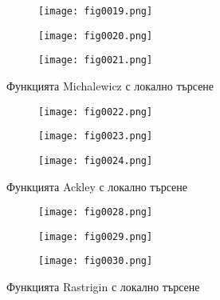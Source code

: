 %
%
\begin{figure}[H]
  \begin{subfigure}{0.31\textwidth}
  \texttt{[image: fig0019.png]}
  \label{fig0019}
  \end{subfigure}
  \begin{subfigure}{0.31\textwidth}
  \texttt{[image: fig0020.png]}
  \label{fig0020}
  \end{subfigure}
  \begin{subfigure}{0.31\textwidth}
  \texttt{[image: fig0021.png]}
  \label{fig0021}
  \end{subfigure}
  \caption{Функцията Michalewicz с локално търсене}
\end{figure}

\begin{figure}[H]
  \begin{subfigure}{0.31\textwidth}
  \texttt{[image: fig0022.png]}
  \label{fig0022}
  \end{subfigure}
  \begin{subfigure}{0.31\textwidth}
  \texttt{[image: fig0023.png]}
  \label{fig0023}
  \end{subfigure}
  \begin{subfigure}{0.31\textwidth}
  \texttt{[image: fig0024.png]}
  \label{fig0024}
  \end{subfigure}
  \caption{Функцията Ackley с локално търсене}
\end{figure}

\begin{figure}[H]
  \begin{subfigure}{0.31\textwidth}
  \texttt{[image: fig0028.png]}
  \label{fig0028}
  \end{subfigure}
  \begin{subfigure}{0.31\textwidth}
  \texttt{[image: fig0029.png]}
  \label{fig0029}
  \end{subfigure}
  \begin{subfigure}{0.31\textwidth}
  \texttt{[image: fig0030.png]}
  \label{fig0030}
  \end{subfigure}
  \caption{Функцията Rastrigin с локално търсене}
\end{figure}

